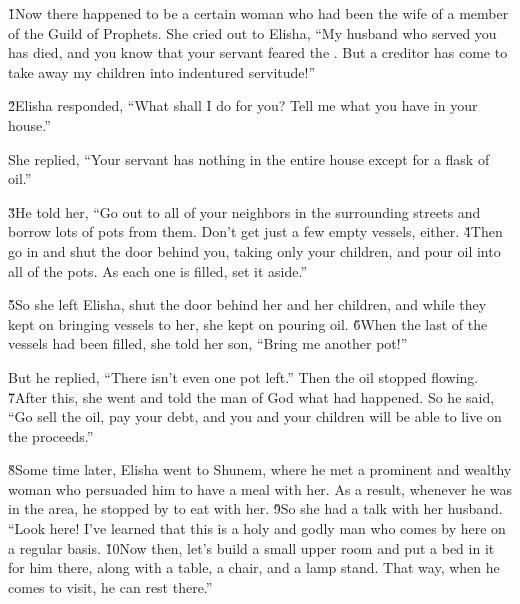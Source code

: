 \v{1}Now there happened to be a certain woman who had been the wife of a member of the Guild of Prophets. She cried out to Elisha, ``My husband who served you has died, and you know that your servant feared the . But a creditor has come to take away my children into indentured servitude!''

\v{2}Elisha responded, ``What shall I do for you? Tell me what you have in your house.''

She replied, ``Your servant has nothing in the entire house except for a flask of oil.''

\v{3}He told her, ``Go out to all of your neighbors in the surrounding streets and borrow lots of pots from them. Don't get just a few empty vessels, either. \v{4}Then go in and shut the door behind you, taking only your children, and pour oil into all of the pots. As each one is filled, set it aside.''

\v{5}So she left Elisha, shut the door behind her and her children, and while they kept on bringing vessels to her, she kept on pouring oil. \v{6}When the last of the vessels had been filled, she told her son, ``Bring me another pot!''

But he replied, ``There isn't even one pot left.'' Then the oil stopped flowing. \v{7}After this, she went and told the man of God what had happened. So he said, ``Go sell the oil, pay your debt, and you and your children will be able to live on the proceeds.''

\v{8}Some time later, Elisha went to Shunem, where he met a prominent and wealthy woman who persuaded him to have a meal with her. As a result, whenever he was in the area, he stopped by to eat with her. \v{9}So she had a talk with her husband. ``Look here! I've learned that this is a holy and godly man who comes by here on a regular basis. \v{10}Now then, let's build a small upper room and put a bed in it for him there, along with a table, a chair, and a lamp stand. That way, when he comes to visit, he can rest there.''

